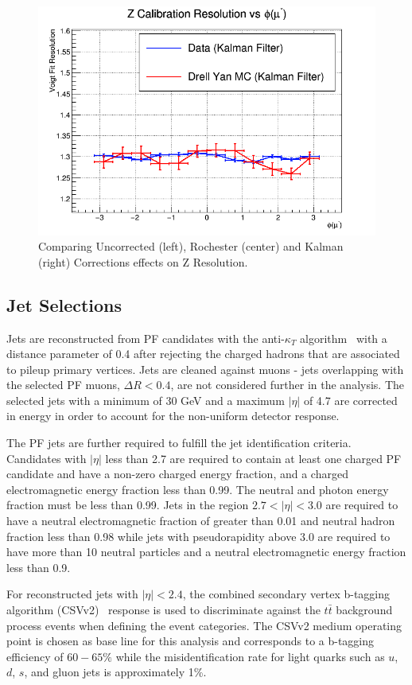 \begin{figure}[hbp]
  \includegraphics[width=0.32\linewidth]{figures/muon_calib/zcal_kamu_mc-data_res_phi_minus.png}
  \caption{Comparing Uncorrected (left), Rochester (center) and Kalman (right) Corrections effects on Z Resolution.}
  \label{fig:higgs_selections_zresolution}
\end{figure}

\subsection{Jet Selections}
Jets are reconstructed from PF candidates with the anti-$\kappa_{T}$ algorithm~\cite{Cacciari:2008gp} with a distance parameter of 0.4 after rejecting the charged hadrons that are associated to pileup primary vertices. Jets are cleaned against muons - jets overlapping with the selected PF muons, $\Delta R < 0.4$, are not considered further in the analysis. The selected jets with a minimum \pt of 30 GeV and a maximum $|\eta|$ of 4.7 are corrected in energy in order to account for the non-uniform detector response.

The PF jets are further required to fulfill the jet identification criteria.
Candidates with $|\eta|$ less than 2.7 are required to contain at
least one charged PF candidate and have a non-zero charged energy fraction,
and a charged electromagnetic energy fraction less than 0.99. The
neutral and photon energy fraction must be less than 0.99. Jets in
the region $2.7<|\eta|<3.0$ are required to have a neutral electromagnetic
fraction of greater than 0.01 and neutral hadron fraction less than
0.98 while jets with pseudorapidity above 3.0 are required to have more
than 10 neutral particles and a neutral electromagnetic energy fraction
less than 0.9.

For reconstructed jets with $|\eta| < 2.4$, the combined secondary vertex b-tagging algorithm (CSVv2)~\cite{Chatrchyan:2012jua} response is used to discriminate against the $t\bar{t}$ background process events when defining the event categories. The CSVv2 medium operating point is chosen as base line for this analysis and corresponds to a b-tagging efficiency of $60-65\%$ while the misidentification rate for light quarks such as $u$, $d$, $s$, and gluon jets is approximately 1\%.

